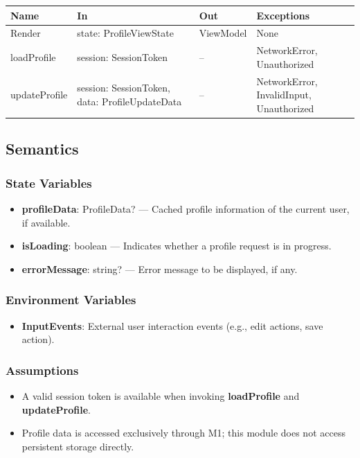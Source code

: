 \documentclass[12pt, titlepage]{article}
\begin{document}
\begin{center}
    \begin{tabular}{p{4.5cm} p{5.2cm} p{3.1cm} p{3.2cm}}
        \toprule
        \textbf{Name} & \textbf{In} & \textbf{Out} & \textbf{Exceptions} \\
        \midrule
        Render & state: ProfileViewState & ViewModel & None \\
        loadProfile & session: SessionToken & -- & NetworkError, Unauthorized \\
        updateProfile & session: SessionToken, data: ProfileUpdateData & -- & NetworkError, InvalidInput, Unauthorized \\
        \bottomrule
    \end{tabular}
\end{center}

\subsection{Semantics}

\subsubsection{State Variables}
\begin{itemize}
    \item \textbf{profileData}: ProfileData? --- Cached profile information of the current user, if available.
    \item \textbf{isLoading}: boolean --- Indicates whether a profile request is in progress.
    \item \textbf{errorMessage}: string? --- Error message to be displayed, if any.
\end{itemize}

\subsubsection{Environment Variables}
\begin{itemize}
    \item \textbf{InputEvents}: External user interaction events (e.g., edit actions, save action).
\end{itemize}

\subsubsection{Assumptions}
\begin{itemize}
    \item A valid session token is available when invoking \textbf{loadProfile} and \textbf{updateProfile}.
    \item Profile data is accessed exclusively through M1; this module does not access persistent storage directly.
\end{itemize}
\end{document}

